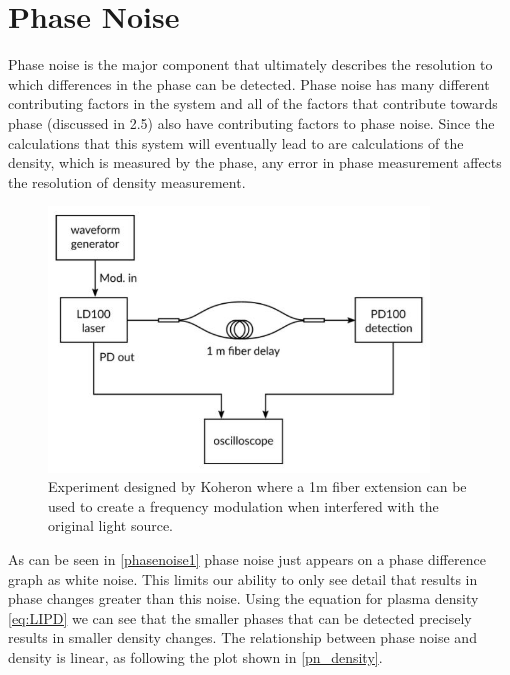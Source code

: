 \documentclass[12pt,a4paper,oneside]{report}
\begin{document}
\section{Phase Noise}
Phase noise is the major component that ultimately describes the resolution to which differences in the phase can be detected. Phase noise has many different contributing factors in the system and all of the factors that contribute towards phase (discussed in 2.5) also have contributing factors to phase noise. Since the calculations that this system will eventually lead to are calculations of the density, which is measured by the phase, any error in phase measurement affects the resolution of density measurement.

\begin{figure}[H]
\includegraphics[width=0.9\textwidth, center,angle=0]{DImages/koheronfmod.JPG}
\caption{Experiment designed by Koheron where a 1m fiber extension can be used to create a frequency modulation when interfered with the original light source.}
\label{phasenoise1}
\end{figure}
As can be seen in \autoref{phasenoise1} phase noise just appears on a phase difference graph as white noise. This limits our ability to only see detail that results in phase changes greater than this noise. Using the equation for plasma density \autoref{eq:LIPD} we can see that the smaller phases that can be detected precisely results in smaller density changes. The relationship between phase noise and density is linear, as following the plot shown in \autoref{pn_density}.
\end{document}
